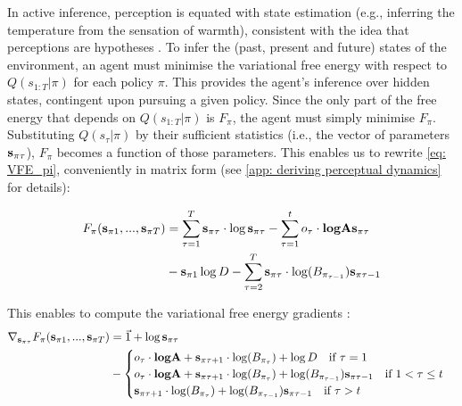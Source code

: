 \documentclass[review,12pt,authoryear]{elsarticle}
\begin{document}
In active inference, perception is equated with state estimation \citep{fristonActiveInferenceProcess2017} (e.g., inferring the temperature from the sensation of warmth), consistent with the idea that perceptions are hypotheses \citep{gregoryPerceptionsHypotheses1980}. To infer the (past, present and future) states of the environment, an agent must minimise the variational free energy with respect to $Q(s_{1:T}|\pi)$ for each policy $\pi$. This provides the agent’s inference over hidden states, contingent upon pursuing a given policy. Since the only part of the free energy that depends on $Q(s_{1:T}|\pi)$ is $F_\pi$, the agent must simply minimise $F_\pi$. 
Substituting $Q(s_{\tau}|\pi)$ by their sufficient statistics (i.e., the vector of parameters $\bold s_{\pi \tau}$), $F_\pi$ becomes a function of those parameters. This enables us to rewrite \eqref{eq: VFE_pi}, conveniently in matrix form (see \ref{app: deriving perceptual dynamics} for details):

\begin{equation}
\label{eq: vfe pi matrix form perception}
  	    \begin{split}
        F_\pi(\bold s_{\pi 1},...,\bold s_{\pi T}) &= \sum_{\tau = 1}^T \bold s_{\pi \tau } \cdot \log \bold s_{\pi \tau } 
        - \sum_{\tau = 1}^t o_\tau \cdot \textbf{log} \bold A \bold s_{\pi \tau }\\
        &- \bold s_{\pi 1 } \log D- \sum_{\tau = 2}^T \bold s_{\pi \tau } \cdot \log (B_{\pi_{\tau-1}})\bold s_{\pi \tau-1 }
    \end{split}
\end{equation}

This enables to compute the variational free energy gradients \citep{petersenMatrixCookbook2012}:
\begin{equation}
    \label{eq:vfe gradients perception}
    \begin{split}
        \nabla_{\bold s_{\pi\tau}} F_\pi(\bold s_{\pi 1},...,\bold s_{\pi T})& = \vec {1} +\log  \bold s_{\pi\tau}  \\
        &- \begin{cases}
             o_\tau \cdot \textbf{log} \bold A+ \bold s_{\pi\tau+1} \cdot \log (B_{\pi_{\tau}}) + \log D \quad  \text{if } \tau = 1 \\
            o_\tau \cdot \textbf{log} \bold A+ \bold s_{\pi\tau+1} \cdot \log (B_{\pi_{\tau}}) +\log (B_{\pi_{\tau-1}}) \bold s_{\pi\tau-1} \quad \text{if } 1<\tau \leq t  \\
             \bold s_{\pi\tau+1} \cdot \log (B_{\pi_{\tau}}) +\log (B_{\pi_{\tau-1}}) \bold s_{\pi\tau-1} \quad \text{if }  \tau > t
        \end{cases}
    \end{split}
\end{equation}
\end{document}
